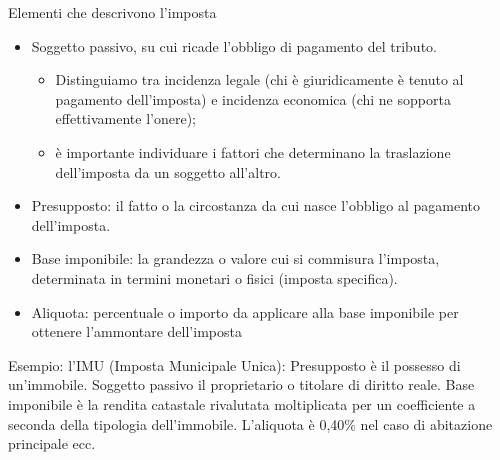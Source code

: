\documentclass[aspectratio=64,12pt]{beamer}
\begin{document}
\begin{frame}{Elementi che descrivono l'imposta}
\begin{resize}{.95}
\begin{itemize}
\item \alert{Soggetto passivo}, su cui ricade l'obbligo di pagamento del
tributo. 
\begin{itemize}
\item Distinguiamo tra \alert{incidenza legale} (chi è giuridicamente è tenuto
  al pagamento dell'imposta) e \alert{incidenza economica} (chi ne sopporta
  effettivamente l'onere);
\item è importante individuare i fattori che determinano la
  \alert{traslazione} dell'imposta da un soggetto all'altro.
\end{itemize}
\item \alert{Presupposto}: il fatto o la circostanza da cui nasce l'obbligo al pagamento
dell'imposta.
\item \alert{Base imponibile}: la grandezza o valore cui si commisura l'imposta, determinata in termini monetari o fisici (imposta \alert{specifica}).
\item \alert{Aliquota}: percentuale o importo da applicare alla base imponibile per
ottenere l'ammontare dell'imposta
\end{itemize}

\begin{block}{}
\alert{Esempio: l'IMU (Imposta Municipale Unica):} Presupposto è il possesso di un'immobile. Soggetto passivo il proprietario o
titolare di diritto reale. Base imponibile è la rendita catastale rivalutata
moltiplicata per un coefficiente a seconda della tipologia
dell'immobile. L'aliquota è 0,40\% nel caso di abitazione principale ecc.
\end{block}
\end{resize}
\end{frame}
\end{document}
